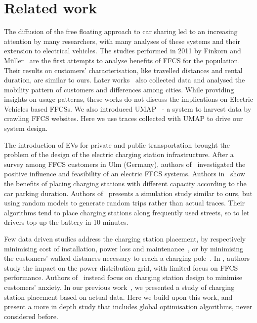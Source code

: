 \section{Related work}\label{sec:related}


The diffusion of the free floating approach to car sharing led to an increasing attention by many researchers, with many analyses of
these systems and their extension to electrical vehicles. 
The studies performed in 2011 by Finkorn and M\"{u}ller~\cite{Firnkorn2011,FM12} are the first attempts to analyse benefits of FFCS for the population. Their results on customers' characterisation, like travelled distances and rental duration, are similar to ours.
Later works~\cite{Car2GoGlobalAnalysis,Kortum2016,Schmoller2015} also collected data and analysed the mobility pattern of customers and differences among cities. While providing insights on usage patterns, these works do not discuss the implications on Electric Vehicles based FFCSs. We also introduced UMAP~\cite{UMAP} - a system to harvest data by crawling FFCS websites. Here we use traces collected with UMAP to drive our system design.

The introduction of EVs for private and public transportation brought the problem of the design of the electric charging station infrastructure.
After a survey among FFCS customers in Ulm (Germany), authors of~\cite{FM15}  investigated the positive influence and feasibility of an electric FFCS systems.
Authors in~\cite{ChargingStationForVehicularNetworks} show the benefits of placing charging stations with different capacity according to the car parking duration. 
Authors of~\cite{bi2017simulation} presents a simulation study similar to ours, but using random models to generate random trips rather than actual traces. Their algorithms tend to place charging stations along frequently used streets, so to let drivers top up the battery in 10 minutes.

Few data driven studies address the charging station placement,  by respectively minimising  cost of installation, power loss and maintenance~\cite{taormina,PlacementAndPowergrid,mipCSPpechino}, or by minimising the customers' walked distances necessary to reach a charging pole~\cite{placementAustin}.  
In \cite{PlacementAndPowergrid}, authors study the impact on the power distribution grid, with limited focus on FFCS performance. Authors of~\cite{mipCSPpechino} instead focus on charging station design to minimise customers' anxiety. 
In our previous work~\cite{taormina}, we presented a study of charging station placement based on actual data. Here we build upon this work, and present a more in depth study that includes global optimisation algorithms, never considered before.

